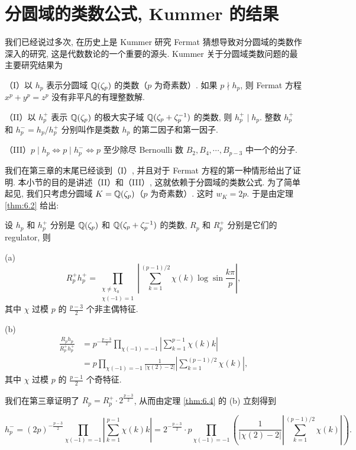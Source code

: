 \section{分圆域的类数公式, Kummer 的结果}\label{sec:ch6-s3}

我们已经说过多次, 在历史上是 Kummer 研究 Fermat 猜想导致对分圆域的类数作深入的研究, 这是代数数论的一个重要的源头. Kummer 关于分圆域类数问题的最主要研究结果为

（I）以 $h_p$ 表示分圆域 $\mathbb{Q}(\zeta_p)$ 的类数（$p$ 为奇素数）. 如果 $p\nmid h_p$, 则 Fermat 方程 $x^p+y^p=z^p$ 没有非平凡的有理整数解.

（II）以 $h_p^+$ 表示 $\mathbb{Q}(\zeta_p)$ 的极大实子域 $\mathbb{Q}(\zeta_p+\zeta_p^{-1})$ 的类数, 则 $h_p^+\mid h_p$. 整数 $h_p^+$ 和 $h_p^-=h_p/h_p^+$ 分别叫作是类数 $h_p$ 的第二因子和第一因子.

（III）$p\mid h_p\Leftrightarrow p\mid h_p^-\Leftrightarrow p$ 至少除尽 Bernoulli 数 $B_2,B_4,\cdots,B_{p-3}$ 中一个的分子.

我们在第三章的末尾已经谈到（I）, 并且对于 Fermat 方程的第一种情形给出了证明. 本小节的目的是讲述（II）和（III）, 这就依赖于分圆域的类数公式. 为了简单起见, 我们只考虑分圆域 $K=\mathbb{Q}(\zeta_p)$（$p$ 为奇素数）. 这时 $w_K=2p$. 于是由定理 \ref{thm:6.2} 给出:

\begin{theorem}\label{thm:6.4}
设 $h_p$ 和 $h_p^+$ 分别是 $\mathbb{Q}(\zeta_p)$ 和 $\mathbb{Q}(\zeta_p+\zeta_p^{-1})$ 的类数, $R_p$ 和 $R_p^+$ 分别是它们的 regulator, 则

(a)
\[
  R_p^+h_p^+=\prod_{\substack{\chi\neq\chi_0\\ \chi(-1)=1}}\left|\sum_{k=1}^{(p-1)/2}\chi(k)\log\sin\frac{k\pi}{p}\right|,
\]
其中 $\chi$ 过模 $p$ 的 $\frac{p-3}{2}$ 个非主偶特征.

(b)
\[
  \begin{aligned}
    \frac{R_ph_p}{R_p^+h_p^+}&=p^{-\frac{p-3}{2}}\prod_{\chi(-1)=-1}\left|\sum_{k=1}^{p-1}\chi(k)k\right|\\
    &=p\prod_{\chi(-1)=-1}\frac{1}{|\chi(2)-2|}\left|\sum_{k=1}^{(p-1)/2}\chi(k)\right|,
  \end{aligned}
\]
其中 $\chi$ 过模 $p$ 的 $\frac{p-1}{2}$ 个奇特征.
\end{theorem}

我们在第三章证明了 $R_p=R_p^+\cdot 2^{\frac{p-3}{2}}$, 从而由定理 \ref{thm:6.4} 的 (b) 立刻得到

\begin{corollarynonum}
\[
  h_p^-=(2p)^{-\frac{p-3}{2}}\prod_{\chi(-1)=-1}\left|\sum_{k=1}^{p-1}\chi(k)k\right|
  =2^{-\frac{p-3}{2}}\cdot p\prod_{\chi(-1)=-1}\left(\frac{1}{|\chi(2)-2|}\left|\sum_{k=1}^{(p-1)/2}\chi(k)\right|\right).
\]
\end{corollarynonum}

